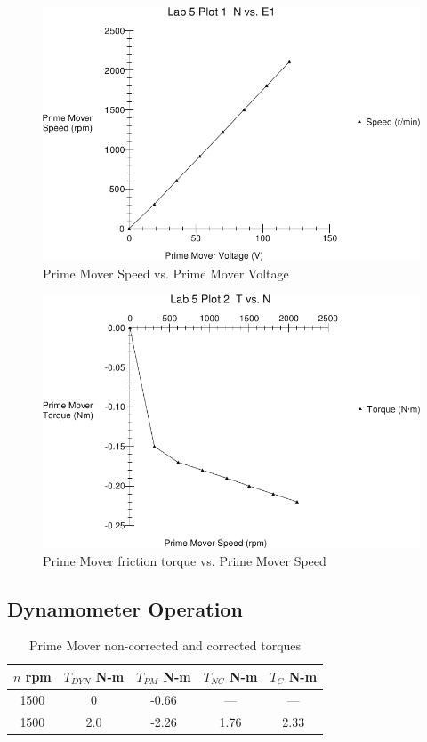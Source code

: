 \documentclass{article}
\begin{document}
\begin{figure}[H]
  \centering
  \includegraphics[width=\textwidth]{img/plot1}
  \caption{Prime Mover Speed vs. Prime Mover Voltage}
  \label{fig:plot_01}
\end{figure}

\begin{figure}[H]
  \centering
  \includegraphics[width=\textwidth]{img/plot2}
  \caption{Prime Mover friction torque vs. Prime Mover Speed}
  \label{fig:plot_02}
\end{figure}

\subsection{Dynamometer Operation}

\begin{table}[H]
  \centering
  \begin{tabular}{*{5}{c}}
    $n$ rpm & $T_{DYN}$ N-m& $T_{PM}$ N-m & $T_{NC}$ N-m & $T_C$ N-m \\
    \hline
    1500 &   0 & -0.66 &  --- &  --- \\
    1500 & 2.0 & -2.26 & 1.76 & 2.33 \\
  \end{tabular}
  \caption{Prime Mover non-corrected and corrected torques}
  \label{tab:table_03}
\end{table}
\end{document}
